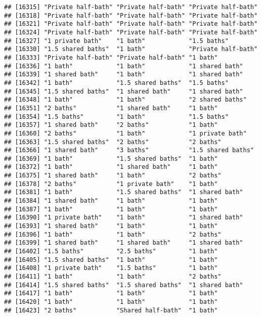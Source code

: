 \documentclass[
]{article}
\begin{document}
\begin{verbatim}
## [16315] "Private half-bath" "Private half-bath" "Private half-bath"
## [16318] "Private half-bath" "Private half-bath" "Private half-bath"
## [16321] "Private half-bath" "Private half-bath" "Private half-bath"
## [16324] "Private half-bath" "Private half-bath" "Private half-bath"
## [16327] "1 private bath"    "1 bath"            "1.5 baths"        
## [16330] "1.5 shared baths"  "1 bath"            "Private half-bath"
## [16333] "Private half-bath" "Private half-bath" "1 bath"           
## [16336] "1 bath"            "1 bath"            "1 shared bath"    
## [16339] "1 shared bath"     "1 bath"            "1 shared bath"    
## [16342] "1 bath"            "1.5 shared baths"  "1.5 baths"        
## [16345] "1.5 shared baths"  "1 shared bath"     "1 shared bath"    
## [16348] "1 bath"            "1 bath"            "2 shared baths"   
## [16351] "2 baths"           "1 shared bath"     "1 bath"           
## [16354] "1.5 baths"         "1 bath"            "1.5 baths"        
## [16357] "1 shared bath"     "2 baths"           "1 bath"           
## [16360] "2 baths"           "1 bath"            "1 private bath"   
## [16363] "1.5 shared baths"  "2 baths"           "2 baths"          
## [16366] "1 shared bath"     "3 baths"           "1.5 shared baths" 
## [16369] "1 bath"            "1.5 shared baths"  "1 bath"           
## [16372] "1 bath"            "1 shared bath"     "1 bath"           
## [16375] "1 shared bath"     "1 bath"            "2 baths"          
## [16378] "2 baths"           "1 private bath"    "1 bath"           
## [16381] "1 bath"            "1.5 shared baths"  "1 shared bath"    
## [16384] "1 shared bath"     "1 bath"            "1 bath"           
## [16387] "1 bath"            "1 bath"            "1 bath"           
## [16390] "1 private bath"    "1 bath"            "1 shared bath"    
## [16393] "1 shared bath"     "1 bath"            "1 bath"           
## [16396] "1 bath"            "1 bath"            "2 baths"          
## [16399] "1 shared bath"     "1 shared bath"     "1 shared bath"    
## [16402] "1.5 baths"         "2.5 baths"         "1 bath"           
## [16405] "1.5 shared baths"  "1 bath"            "1 bath"           
## [16408] "1 private bath"    "1.5 baths"         "1 bath"           
## [16411] "1 bath"            "1 bath"            "2 baths"          
## [16414] "1.5 shared baths"  "1.5 shared baths"  "1 shared bath"    
## [16417] "1 bath"            "1 bath"            "1 bath"           
## [16420] "1 bath"            "1 bath"            "1 bath"           
## [16423] "2 baths"           "Shared half-bath"  "1 bath"           

\end{verbatim}
\end{document}
